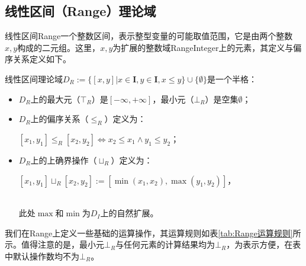 \subsection{线性区间（Range）理论域}
\label{sec:Range}

线性区间Range一个整数区间，表示整型变量的可能取值范围，它是由两个整数$ x, y $构成的二元组。这里，$ x, y $为扩展的整数域RangeInteger上的元素，其定义与偏序关系定义如下。

\begin{definition}
	线性区间理论域$ D_R :=  \{ [x, y] | x \in \mathbf{I}, y \in \mathbf{I}, x \le y \} \cup \{ \emptyset \}$是一个半格：	
	\begin{itemize}
		\item $ D_R $上的最大元（$ \top_R $）是$ [-\infty, +\infty] $，最小元（$ \bot_R $）是空集$ \emptyset $；
		\item $ D_R $上的偏序关系（$ \le_R $）定义为：\\	
		\centerline{$ [x_1, y_1] \le_R [x_2, y_2] \iff x_2 \le x_1 \land y_1 \le y_2 $；}
		\item $ D_R $上的上确界操作（$ \sqcup_R $）定义为：\\	
		\centerline{$ [x_1, y_1] \sqcup_R [x_2, y_2] := [\min(x_1, x_2), \max(y_1, y_2)] $，}  \\
		此处$ \max $和$ \min $为$ D_I $上的自然扩展。
	\end{itemize}
\end{definition}

我们在Range上定义一些基础的运算操作，其运算规则如表\ref{tab:Range运算规则}所示。值得注意的是，最小元$ \bot_R $与任何元素的计算结果均为$ \bot_R $，为表示方便，在表中默认操作数均不为$ \bot_R $。

